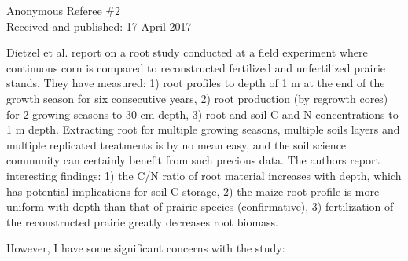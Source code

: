 \documentclass[]{article}
\begin{document}
Anonymous Referee \#2\\
Received and published: 17 April 2017

Dietzel et al. report on a root study conducted at a field experiment
where continuous corn is compared to reconstructed fertilized and
unfertilized prairie stands. They have measured: 1) root profiles to
depth of 1 m at the end of the growth season for six consecutive years,
2) root production (by regrowth cores) for 2 growing seasons to 30 cm
depth, 3) root and soil C and N concentrations to 1 m depth. Extracting
root for multiple growing seasons, multiple soils layers and multiple
replicated treatments is by no mean easy, and the soil science community
can certainly benefit from such precious data. The authors report
interesting findings: 1) the C/N ratio of root material increases with
depth, which has potential implications for soil C storage, 2) the maize
root profile is more uniform with depth than that of prairie species
(confirmative), 3) fertilization of the reconstructed prairie greatly
decreases root biomass.

However, I have some significant concerns with the study:
\end{document}
